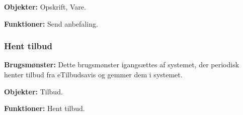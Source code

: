 \textbf{Objekter:} Opskrift, Vare.

\textbf{Funktioner:} Send anbefaling.

\subsubsection*{Hent tilbud}
\textbf{Brugsmønster:} Dette brugsmønster igangsættes af systemet, der periodisk henter tilbud fra eTilbudsavis og gemmer dem i systemet.

\textbf{Objekter:} Tilbud.

\textbf{Funktioner:} Hent tilbud.
